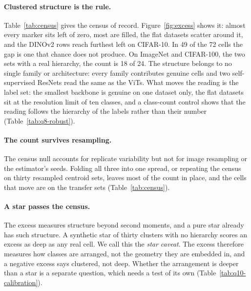 \documentclass{article}
\begin{document}
\paragraph{Clustered structure is the rule.} Table~\ref{tab:census} gives the census of record. Figure~\ref{fig:excess} shows it: almost every marker sits left of zero, most are filled, the flat datasets scatter around it, and the DINOv2 rows reach furthest left on CIFAR-10. In 49 of the 72 cells the gap is one that chance does not produce. On ImageNet and CIFAR-100, the two sets with a real hierarchy, the count is 18 of 24. The structure belongs to no single family or architecture: every family contributes genuine cells and two self-supervised ResNets read the same as the ViTs. What moves the reading is the label set: the smallest backbone is genuine on one dataset only, the flat datasets sit at the resolution limit of ten classes, and a class-count control shows that the reading follows the hierarchy of the labels rather than their number (Table~\ref{tab:q8-robust}). %

\paragraph{The count survives resampling.} The census null accounts for replicate variability but not for image resampling or the estimator's seeds. Folding all three into one spread, or repeating the census on thirty resampled centroid sets, leaves most of the count in place, and the cells that move are on the transfer sets (Table~\ref{tab:census}). %

\paragraph{A star passes the census.} The excess measures structure beyond second moments, and a pure star already has such structure. A synthetic star of thirty clusters with no hierarchy scores an excess as deep as any real cell. We call this the \emph{star caveat}. The excess therefore measures how classes are arranged, not the geometry they are embedded in, and a negative excess says clustered, not deep. Whether the arrangement is deeper than a star is a separate question, which needs a test of its own (Table~\ref{tab:q10-calibration}). %
\end{document}
